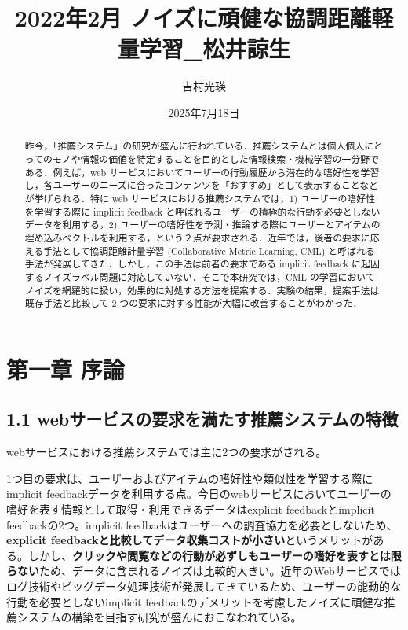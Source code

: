 \documentclass[11pt,a4paper]{article}
\title{2022年2月 ノイズに頑健な協調距離軽量学習\_松井諒生}
\author{吉村光瑛}
\date{2025年7月18日}
\begin{document}
\maketitle

\begin{abstract}
  昨今，「推薦システム」の研究が盛んに行われている．推薦システムとは個人個人にとってのモノや情報の価値を特定することを目的とした情報検索・機械学習の一分野である．例えば，web サービスにおいてユーザーの行動履歴から潜在的な嗜好性を学習し，各ユーザーのニーズに合ったコンテンツを「おすすめ」として表示することなどが挙げられる．特に web サービスにおける推薦システムでは，1) ユーザーの嗜好性を学習する際に implicit feedback と呼ばれるユーザーの積極的な行動を必要としないデータを利用する，2) ユーザーの嗜好性を予測・推論する際にユーザーとアイテムの埋め込みベクトルを利用する，という２点が要求される．近年では，後者の要求に応える手法として協調距離計量学習 (Collaborative Metric Learning, CML) と呼ばれる手法が発展してきた．しかし，この手法は前者の要求である implicit feedback に起因するノイズラベル問題に対応していない．そこで本研究では，CML の学習においてノイズを網羅的に扱い，効果的に対処する方法を提案する．実験の結果，提案手法は既存手法と比較して 2 つの要求に対する性能が大幅に改善することがわかった．
\end{abstract}

\section*{第一章 序論}

\subsection*{1.1 webサービスの要求を満たす推薦システムの特徴}
webサービスにおける推薦システムでは主に2つの要求がされる。

1つ目の要求は、ユーザーおよびアイテムの嗜好性や類似性を学習する際にimplicit feedbackデータを利用する点。今日のwebサービスにおいてユーザーの嗜好を表す情報として取得・利用できるデータはexplicit feedbackとimplicit feedbackの2つ。implicit feedbackはユーザーへの調査協力を必要としないため、\textbf{explicit feedbackと比較してデータ収集コストが小さい}というメリットがある。しかし、\textbf{クリックや閲覧などの行動が必ずしもユーザーの嗜好を表すとは限らない}ため、データに含まれるノイズは比較的大きい。近年のWebサービスではログ技術やビッグデータ処理技術が発展してきているため、ユーザーの能動的な行動を必要としないimplicit feedbackのデメリットを考慮したノイズに頑健な推薦システムの構築を目指す研究が盛んにおこなわれている。
\end{document}
